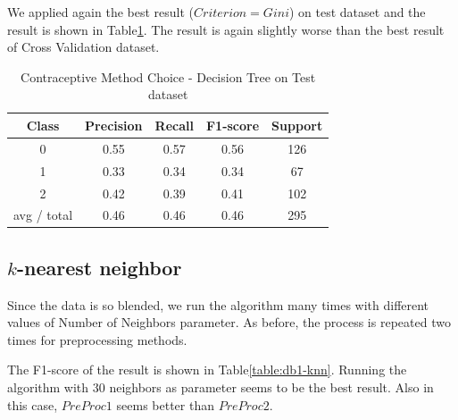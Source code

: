 We applied again the best result ($Criterion=Gini$) on test dataset and the result is shown in Table\ref{table:db1-decisiontree-test}. The result is again slightly worse than the best result of Cross Validation dataset.


\begin{table}[p]
\begin{center}
\begin{tabular}{|c|c|c|c|c|}
\hline Class & Precision & Recall & F1-score & Support \\

\hline 0 & 0.55 & 0.57 & 0.56 & 126\\
\hline 1 & 0.33 & 0.34 & 0.34 & 67\\
\hline 2 & 0.42 & 0.39 & 0.41 & 102\\
\hline avg / total & 0.46 & 0.46 & 0.46 & 295\\
\hline
\end{tabular}

\caption{Contraceptive Method Choice - Decision Tree on Test dataset}
\label{table:db1-decisiontree-test}
\end{center}
\end{table}

\subsection{$k$-nearest neighbor}
Since the data is so blended, we run the algorithm many times with different values of Number of Neighbors parameter. As before, the process is repeated two times for preprocessing methods.

The F1-score of the result is shown in Table\ref{table:db1-knn}. Running the algorithm with $30$ neighbors as parameter seems to be the best result. Also in this case, $PreProc1$ seems better than $PreProc2$.


